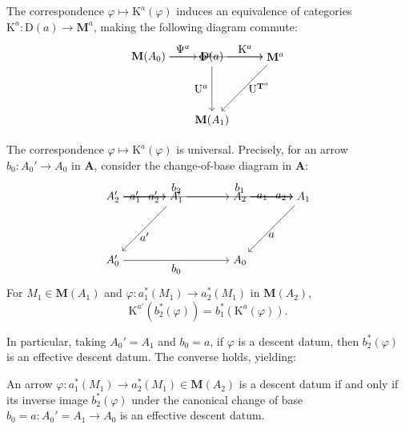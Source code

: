 \documentclass{article}
\begin{document}
\begin{theorem}
\label{thm:equivalence}
The correspondence $\varphi \mapsto \mathrm{K}^a(\varphi)$ induces an equivalence of categories $\mathrm{K}^a : \mathrm{D}(a) \to \mathbf{M}^a$, making the following diagram commute:
\[
\begin{tikzpicture}
    \node (M0) at (0,2) {$\mathbf{M}(A_0)$};
    \node (Da) at (2,2) {$\mathrm{D}(a)$};
    \node (Ma) at (4,2) {$\mathbf{M}^a$};
    \node (M1) at (2,0) {$\mathbf{M}(A_1)$};
    \draw[->] (M0) to node[above] {$\Psi^a$} (Da);
    \draw[->] (Da) to node[above] {$\mathrm{K}^a$} (Ma);
    \draw[->] (M0) to node[left] {$\Phi^a$} (Ma);
    \draw[->] (Da) to node[left] {$\mathrm{U}^a$} (M1);
    \draw[->] (Ma) to node[right] {$\mathrm{U}^{\mathbf{T}^a}$} (M1);
\end{tikzpicture}
\]
\end{theorem}

\begin{proposition}
\label{prop:universal}
The correspondence $\varphi \mapsto \mathrm{K}^a(\varphi)$ is universal. Precisely, for an arrow $b_0 : A_0' \to A_0$ in $\mathbf{A}$, consider the change-of-base diagram in $\mathbf{A}$:
\[
\begin{tikzpicture}
    \node (A2') at (0,2) {$A_2'$};
    \node (A1') at (2,2) {$A_1'$};
    \node (A0') at (0,0) {$A_0'$};
    \node (A2) at (4,2) {$A_2$};
    \node (A1) at (6,2) {$A_1$};
    \node (A0) at (4,0) {$A_0$};
    \draw[->] (A2') to node[above] {$b_2$} (A2);
    \draw[->] (A1') to node[above] {$b_1$} (A1);
    \draw[->] (A0') to node[below] {$b_0$} (A0);
    \draw[->] (A2') to node[left] {$a_1'$} (A1');
    \draw[->] (A2) to node[left] {$a_1$} (A1);
    \draw[->] (A2') to node[right] {$a_2'$} (A1');
    \draw[->] (A2) to node[right] {$a_2$} (A1);
    \draw[->] (A1') to node[below] {$a'$} (A0');
    \draw[->] (A1) to node[below] {$a$} (A0);
\end{tikzpicture}
\]
For $M_1 \in \mathbf{M}(A_1)$ and $\varphi : a_1^*(M_1) \to a_2^*(M_1)$ in $\mathbf{M}(A_2)$,
\[
\mathrm{K}^{a'}(b_2^*(\varphi)) = b_1^*(\mathrm{K}^a(\varphi)).
\]
\end{proposition}

In particular, taking $A_0' = A_1$ and $b_0 = a$, if $\varphi$ is a descent datum, then $b_2^*(\varphi)$ is an effective descent datum. The converse holds, yielding:

\begin{corollary}
\label{cor:effective-descent}
An arrow $\varphi : a_1^*(M_1) \to a_2^*(M_1) \in \mathbf{M}(A_2)$ is a descent datum if and only if its inverse image $b_2^*(\varphi)$ under the canonical change of base $b_0 = a : A_0' = A_1 \to A_0$ is an effective descent datum.
\end{corollary}
\end{document}
